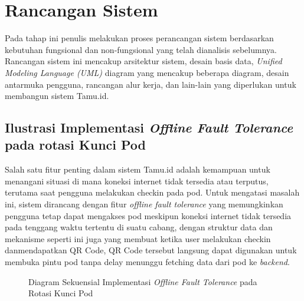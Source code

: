 \section{Rancangan Sistem}

Pada tahap ini penulis melakukan proses perancangan sistem berdasarkan kebutuhan fungsional dan non-fungsional yang telah dianalisis sebelumnya. Rancangan sistem ini mencakup arsitektur sistem, desain basis data, \textit{Unified Modeling Language (UML)} diagram yang mencakup beberapa diagram, desain antarmuka pengguna, rancangan alur kerja, dan lain-lain yang diperlukan untuk membangun sistem Tamu.id.





\subsection{Ilustrasi Implementasi  \textit{Offline Fault Tolerance} pada rotasi Kunci Pod}

Salah satu fitur penting dalam sistem Tamu.id adalah kemampuan untuk menangani situasi di mana koneksi internet tidak tersedia atau terputus, terutama saat pengguna melakukan checkin pada pod. Untuk mengatasi masalah ini, sistem dirancang dengan fitur \textit{offline fault tolerance} yang memungkinkan pengguna tetap dapat mengakses pod meskipun koneksi internet tidak tersedia pada tenggang waktu tertentu di suatu cabang, dengan struktur data dan mekanisme seperti ini juga yang membuat ketika user melakukan checkin danmendapatkan QR Code, QR Code tersebut langsung dapat digunakan untuk membuka pintu pod tanpa delay menunggu fetching data dari pod ke \textit{backend}.

\begin{figure}[H]
    \centering
    \caption{Diagram Sekuensial Implementasi \textit{Offline Fault Tolerance} pada Rotasi Kunci Pod}
    \label{fig:oth_oft} %
\end{figure}

% 


